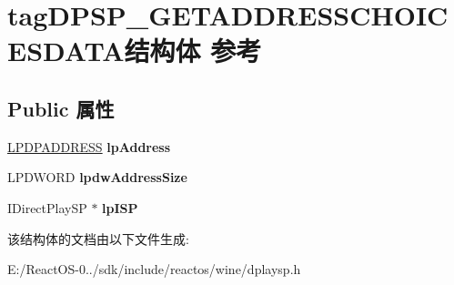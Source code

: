 \hypertarget{structtag_d_p_s_p___g_e_t_a_d_d_r_e_s_s_c_h_o_i_c_e_s_d_a_t_a}{}\section{tag\+D\+P\+S\+P\+\_\+\+G\+E\+T\+A\+D\+D\+R\+E\+S\+S\+C\+H\+O\+I\+C\+E\+S\+D\+A\+T\+A结构体 参考}
\label{structtag_d_p_s_p___g_e_t_a_d_d_r_e_s_s_c_h_o_i_c_e_s_d_a_t_a}
\subsection*{Public 属性}
\begin{DoxyCompactItemize}
\item 
\mbox{\label{structtag_d_p_s_p___g_e_t_a_d_d_r_e_s_s_c_h_o_i_c_e_s_d_a_t_a_a3090da9f76ef73d02d2273e71dc5c7a4}} 
\hyperlink{structtag_d_p_a_d_d_r_e_s_s}{L\+P\+D\+P\+A\+D\+D\+R\+E\+SS} {\bfseries lp\+Address}
\item 
\mbox{\label{structtag_d_p_s_p___g_e_t_a_d_d_r_e_s_s_c_h_o_i_c_e_s_d_a_t_a_abe29d696868f51930128516c65c5aa83}} 
L\+P\+D\+W\+O\+RD {\bfseries lpdw\+Address\+Size}
\item 
\mbox{\label{structtag_d_p_s_p___g_e_t_a_d_d_r_e_s_s_c_h_o_i_c_e_s_d_a_t_a_ad2d8a1a64fcc9b7d9954bbd56af07b73}} 
I\+Direct\+Play\+SP $\ast$ {\bfseries lp\+I\+SP}
\end{DoxyCompactItemize}


该结构体的文档由以下文件生成\+:\begin{DoxyCompactItemize}
\item 
E\+:/\+React\+O\+S-\/0../sdk/include/reactos/wine/dplaysp.\+h\end{DoxyCompactItemize}
